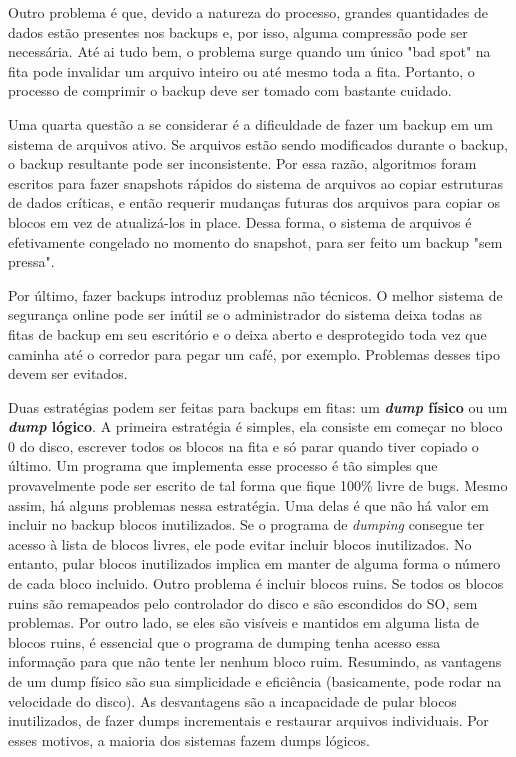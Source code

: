 \documentclass{article}
\begin{document}
Outro problema é que, devido a natureza do processo, grandes quantidades de dados estão presentes nos backups e, por isso, alguma compressão pode ser necessária. Até ai tudo bem, o problema surge quando um único "bad spot" na fita pode invalidar um arquivo inteiro ou até mesmo toda a fita. Portanto, o processo de comprimir o backup deve ser tomado com bastante cuidado.

Uma quarta questão a se considerar é a dificuldade de fazer um backup em um sistema de arquivos ativo. Se arquivos estão sendo modificados durante o backup, o backup resultante pode ser inconsistente. Por essa razão, algoritmos foram escritos para fazer snapshots rápidos do sistema de arquivos ao copiar estruturas de dados críticas, e então requerir mudanças futuras dos arquivos para copiar os blocos em vez de atualizá-los in place. Dessa forma, o sistema de arquivos é efetivamente congelado no momento do snapshot, para ser feito um backup "sem pressa".

Por último, fazer backups introduz problemas não técnicos. O melhor sistema de segurança online pode ser inútil se o administrador do sistema deixa todas as fitas de backup em seu escritório e o deixa aberto e desprotegido toda vez que caminha até o corredor para pegar um café, por exemplo. Problemas desses tipo devem ser evitados. 

Duas estratégias podem ser feitas para backups em fitas: um \textbf{\textit{dump} físico} ou um \textbf{\textit{dump} lógico}. A primeira estratégia é simples, ela consiste em começar no bloco 0 do disco, escrever todos os blocos na fita e só parar quando tiver copiado o último. Um programa que implementa esse processo é tão simples que provavelmente pode ser escrito de tal forma que fique 100\% livre de bugs. Mesmo assim, há alguns problemas nessa estratégia. Uma delas é que não há valor em incluir no backup blocos inutilizados. Se o programa de \textit{dumping} consegue ter acesso à lista de blocos livres, ele pode evitar incluir blocos inutilizados. No entanto, pular blocos inutilizados implica em manter de alguma forma o número de cada bloco incluido. Outro problema é incluir blocos ruins. Se todos os blocos ruins são remapeados pelo controlador do disco e são escondidos do SO, sem problemas. Por outro lado, se eles são visíveis e mantidos em alguma lista de blocos ruins, é essencial que o programa de dumping tenha acesso essa informação para que não tente ler nenhum bloco ruim. Resumindo, as vantagens de um dump físico são sua simplicidade e eficiência (basicamente, pode rodar na velocidade do disco). As desvantagens são a incapacidade de pular blocos inutilizados, de fazer dumps incrementais e restaurar arquivos individuais. Por esses motivos, a maioria dos sistemas fazem dumps lógicos.
\end{document}
